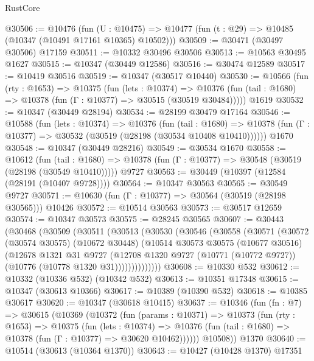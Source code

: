 \begin{lexlean}{RustCore}
\begin{coremodule}
@30506 := @10476
    (fun (U : @10475) => @10477 (fun (t : @29) => @10485 (@10347 (@10491 @17161 @10365) @10502)))
@30509 := @30471 (@30497 @30506) @17159
@30511 := @10332 @30496 @30506
@30513 := @10563 @30495 @1627
@30515 := @10347 (@30449 @12586)
@30516 := @30474 @12589
@30517 := @10419 @30516
@30519 := @10347 (@30517 @10440)
@30530 := @10566
    (fun (rty : @1653) =>
    @10375
      (fun (lets : @10374) =>
      @10376 (fun (tail : @1680) => @10378 (fun (Γ : @10377) => @30515 (@30519 @30484)))))
    @1619
@30532 := @10347 (@30449 @28194)
@30534 := @28199 @30479 @17164
@30546 := @10588
    (fun (lets : @10374) =>
    @10376
      (fun (tail : @1680) =>
      @10378 (fun (Γ : @10377) => @30532 (@30519 (@28198 (@30534 @10408 @10410))))))
    @1670
@30548 := @10347 (@30449 @28216)
@30549 := @30534 @1670
@30558 := @10612
    (fun (tail : @1680) => @10378 (fun (Γ : @10377) => @30548 (@30519 (@28198 (@30549 @10410)))))
    @9727
@30563 := @30449 (@10397 (@12584 (@28191 (@10407 @9728))))
@30564 := @10347 @30563
@30565 := @30549 @9727
@30571 := @10630 (fun (Γ : @10377) => @30564 (@30519 (@28198 @30565))) @10426
@30572 := @10514 @30563
@30573 := @30517 @12659
@30574 := @10347 @30573
@30575 := @28245 @30565
@30607 := @30443
    (@30468
      (@30509
        (@30511
          (@30513
            (@30530
              (@30546
                (@30558
                  (@30571
                    (@30572
                      (@30574 @30575)
                      (@10672 @30448)
                      (@10514
                        @30573
                        @30575
                        (@10677 @30516)
                        (@12678
                          @1321
                          @31
                          @9727
                          (@12708
                            @1320
                            @9727
                            (@10771 (@10772 @9727))
                            (@10776 (@10778 @1320 @31))))))))))))))
@30608 := @10330 @532
@30612 := @10332 (@10336 @532) (@10342 @532)
@30613 := @10351 @17348
@30615 := @10347 (@30613 @10366)
@30617 := @10389 (@10390 @532)
@30618 := @10385 @30617
@30620 := @10347 (@30618 @10415)
@30637 := @10346
    (fun (fn : @7) =>
    @30615
      (@10369
        (@10372
          (fun (params : @10371) =>
          @10373
            (fun (rty : @1653) =>
            @10375
              (fun (lets : @10374) =>
              @10376 (fun (tail : @1680) => @10378 (fun (Γ : @10377) => @30620 @10462))))))
        @10508))
    @1370
@30640 := @10514 (@30613 (@10364 @1370))
@30643 := @10427 (@10428 @1370) @17351

\end{coremodule}
\end{lexlean}

